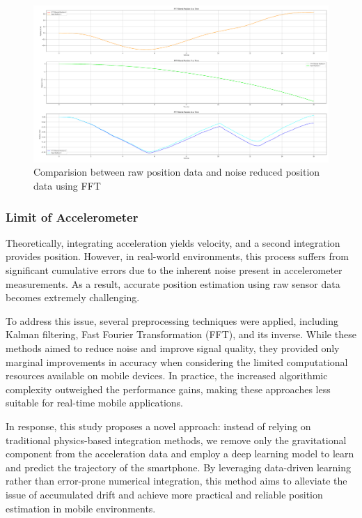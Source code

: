 \documentclass{article}
\begin{document}
\begin{figure}[h]
    \centering
    \includegraphics[width=\textwidth]{2_1_9_3.png}
    \caption{Comparision between raw position data and noise reduced position data using FFT}
    \label{fig:position_fft}
\end{figure}

\FloatBarrier
\subsubsection{Limit of Accelerometer}
Theoretically, integrating acceleration yields velocity, and a second integration provides position. However, in real-world environments, this process suffers from significant cumulative errors due to the inherent noise present in accelerometer measurements. As a result, accurate position estimation using raw sensor data becomes extremely challenging.

To address this issue, several preprocessing techniques were applied, including Kalman filtering, Fast Fourier Transformation (FFT), and its inverse. While these methods aimed to reduce noise and improve signal quality, they provided only marginal improvements in accuracy when considering the limited computational resources available on mobile devices. In practice, the increased algorithmic complexity outweighed the performance gains, making these approaches less suitable for real-time mobile applications.

In response, this study proposes a novel approach: instead of relying on traditional physics-based integration methods, we remove only the gravitational component from the acceleration data and employ a deep learning model to learn and predict the trajectory of the smartphone. By leveraging data-driven learning rather than error-prone numerical integration, this method aims to alleviate the issue of accumulated drift and achieve more practical and reliable position estimation in mobile environments.
\end{document}
